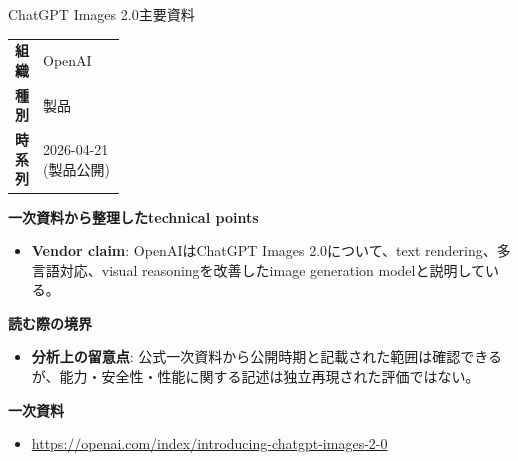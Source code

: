 \begin{technicalnote}{ChatGPT Images 2.0}{主要資料}
\begingroup
\begin{tabularx}{\linewidth}{@{}>{\bfseries}p{0.22\linewidth}X@{}}
組織 & OpenAI \\
種別 & 製品 \\
時系列 & 2026-04-21 (製品公開) \\
\end{tabularx}
\smallskip
{\bfseries 一次資料から整理したtechnical points}
\begin{itemize}[leftmargin=1.5em,itemsep=0.35em]
\item \textbf{Vendor claim}: OpenAIはChatGPT Images 2.0について、text rendering、多言語対応、visual reasoningを改善したimage generation modelと説明している。
\end{itemize}
\begin{minipage}{\linewidth}
{\bfseries 読む際の境界}
\begin{itemize}[leftmargin=1.5em,itemsep=0.35em]
\item \textbf{分析上の留意点}: 公式一次資料から公開時期と記載された範囲は確認できるが、能力・安全性・性能に関する記述は独立再現された評価ではない。
\end{itemize}
\begin{samepage}
{\bfseries 一次資料}
\begingroup\sloppy
\begin{itemize}[leftmargin=1.5em,itemsep=0.25em]
\item {\scriptsize\url{https://openai.com/index/introducing-chatgpt-images-2-0}}
\end{itemize}
\endgroup
\end{samepage}
\end{minipage}
\endgroup
\end{technicalnote}
\medskip

